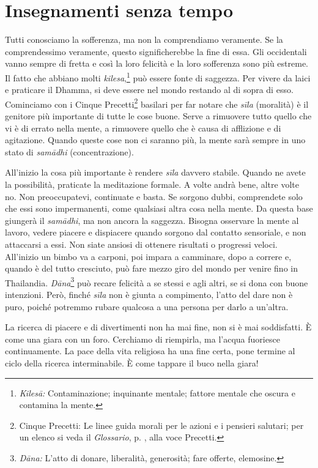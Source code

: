 \chapter{Insegnamenti senza tempo}

Tutti conosciamo la sofferenza, ma non la comprendiamo veramente. Se la
comprendessimo veramente, questo significherebbe la fine di essa. Gli
occidentali vanno sempre di fretta e così la loro felicità e la loro
sofferenza sono più estreme. Il fatto che abbiano molti
\emph{kilesa},\footnote{\emph{Kilesā:} Contaminazione; inquinante
  mentale; fattore mentale che oscura e contamina la mente.} può essere
fonte di saggezza. Per vivere da laici e praticare il Dhamma, si deve
essere nel mondo restando al di sopra di esso. Cominciamo con i Cinque
Precetti\footnote{Cinque Precetti: Le linee guida morali per le azioni e
  i pensieri salutari; per un elenco si veda il \emph{Glossario}, p. \pageref{glossary-precetti}, alla
  voce Precetti.} basilari per far notare che \emph{sīla} (moralità)
è il genitore più importante di tutte le
cose buone. Serve a rimuovere tutto quello che vi è di errato nella
mente, a rimuovere quello che è causa di afflizione e di agitazione.
Quando queste cose non ci saranno più, la mente sarà sempre in uno stato
di \emph{samādhi} (concentrazione).

All'inizio la cosa più importante è rendere \emph{sīla} davvero stabile.
Quando ne avete la possibilità, praticate la meditazione formale. A
volte andrà bene, altre volte no. Non preoccupatevi, continuate e basta.
Se sorgono dubbi, comprendete solo che essi sono impermanenti, come
qualsiasi altra cosa nella mente. Da questa base giungerà il
\emph{samādhi}, ma non ancora la saggezza. Bisogna osservare la mente al
lavoro, vedere piacere e dispiacere quando sorgono dal contatto
sensoriale, e non attaccarsi a essi. Non siate ansiosi di ottenere
risultati o progressi veloci. All'inizio un bimbo va a carponi, poi
impara a camminare, dopo a correre e, quando è del tutto cresciuto, può
fare mezzo giro del mondo per venire fino in Thailandia.
\emph{Dāna}\footnote{\emph{Dāna:} L'atto di donare, liberalità,
  generosità; fare offerte, elemosine.} può recare felicità a se stessi
e agli altri, se si dona con buone intenzioni. Però, finché \emph{sīla}
non è giunta a compimento, l'atto del dare non è puro, poiché potremmo
rubare qualcosa a una persona per darlo a un'altra.

La ricerca di piacere e di divertimenti non ha mai fine, non si è mai
soddisfatti. È come una giara con un foro. Cerchiamo di riempirla, ma
l'acqua fuoriesce continuamente. La pace della vita religiosa ha una
fine certa, pone termine al ciclo della ricerca interminabile. È come
tappare il buco nella giara!

